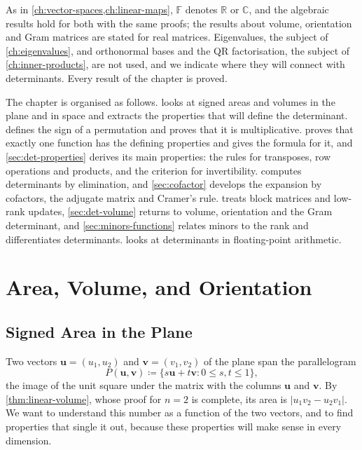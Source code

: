 As in \cref{ch:vector-spaces,ch:linear-maps}, $\mathbb F$ denotes $\mathbb R$ or $\mathbb C$, and the algebraic results hold for both with the same proofs; the results about volume, orientation and Gram matrices are stated for real matrices. Eigenvalues, the subject of \cref{ch:eigenvalues}, and orthonormal bases and the QR factorisation, the subject of \cref{ch:inner-products}, are not used, and we indicate where they will connect with determinants. Every result of the chapter is proved.

The chapter is organised as follows.  looks at signed areas and volumes in the plane and in space and extracts the properties that will define the determinant.  defines the sign of a permutation and proves that it is multiplicative.  proves that exactly one function has the defining properties and gives the formula for it, and \cref{sec:det-properties} derives its main properties: the rules for transposes, row operations and products, and the criterion for invertibility.  computes determinants by elimination, and \cref{sec:cofactor} develops the expansion by cofactors, the adjugate matrix and Cramer's rule.  treats block matrices and low-rank updates, \cref{sec:det-volume} returns to volume, orientation and the Gram determinant, and \cref{sec:minors-functions} relates minors to the rank and differentiates determinants.  looks at determinants in floating-point arithmetic.

\section{Area, Volume, and Orientation}
\label{sec:det-geometry}

\subsection{Signed Area in the Plane}

Two vectors $\mathbf u=(u_1,u_2)$ and $\mathbf v=(v_1,v_2)$ of the plane span the parallelogram
\[
P(\mathbf u,\mathbf v)\coloneqq\{s\mathbf u+t\mathbf v: 0\le s,t\le1\},
\]
the image of the unit square under the matrix with the columns $\mathbf u$ and $\mathbf v$. By \cref{thm:linear-volume}, whose proof for $n=2$ is complete, its area is $|u_1v_2-u_2v_1|$. We want to understand this number as a function of the two vectors, and to find properties that single it out, because these properties will make sense in every dimension.

